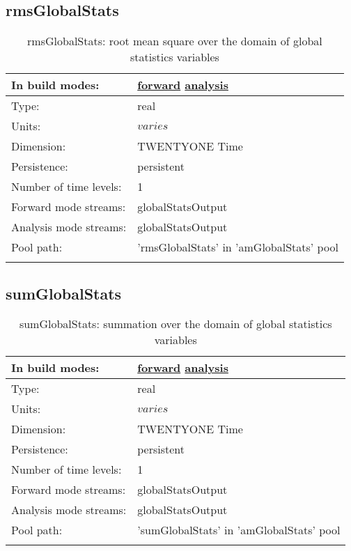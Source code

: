 \subsection[rmsGlobalStats]{rmsGlobalStats}
\label{subsec:var_sec_amGlobalStats_rmsGlobalStats}
\begin{center}
\begin{longtable}{| p{2.0in} | p{4.0in} |}
        \hline 
        In build modes: & \hyperref[subsec:forward_var_tab_amGlobalStats]{forward} \hyperref[subsec:analysis_var_tab_amGlobalStats]{analysis} \\
        \hline 
        Type: & real \\
        \hline 
        Units: & $varies$ \\
        \hline 
        Dimension: & TWENTYONE Time \\
        \hline 
        Persistence: & persistent \\
        \hline 
        Number of time levels: & 1 \\
        \hline 
		 Forward mode streams: &  globalStatsOutput \\
        \hline 
		 Analysis mode streams: &  globalStatsOutput \\
        \hline 
            Pool path: & 'rmsGlobalStats' in 'amGlobalStats' pool
 \\
		 \hline 
    \caption{rmsGlobalStats: root mean square over the domain of global statistics variables}
\end{longtable}
\end{center}
\subsection[sumGlobalStats]{sumGlobalStats}
\label{subsec:var_sec_amGlobalStats_sumGlobalStats}
\begin{center}
\begin{longtable}{| p{2.0in} | p{4.0in} |}
        \hline 
        In build modes: & \hyperref[subsec:forward_var_tab_amGlobalStats]{forward} \hyperref[subsec:analysis_var_tab_amGlobalStats]{analysis} \\
        \hline 
        Type: & real \\
        \hline 
        Units: & $varies$ \\
        \hline 
        Dimension: & TWENTYONE Time \\
        \hline 
        Persistence: & persistent \\
        \hline 
        Number of time levels: & 1 \\
        \hline 
		 Forward mode streams: &  globalStatsOutput \\
        \hline 
		 Analysis mode streams: &  globalStatsOutput \\
        \hline 
            Pool path: & 'sumGlobalStats' in 'amGlobalStats' pool
 \\
		 \hline 
    \caption{sumGlobalStats: summation over the domain of global statistics variables}
\end{longtable}
\end{center}
